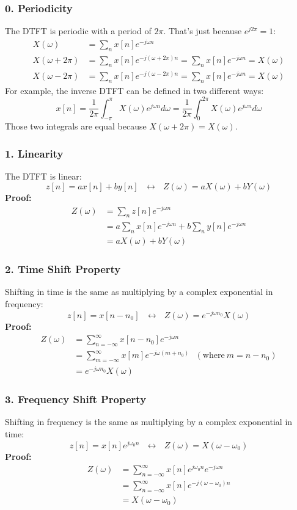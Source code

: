 \documentclass{beamer}
\begin{document}
\begin{frame}
  \frametitle{0. Periodicity}

  The DTFT is periodic with a  period of $2\pi$.  That's just because  $e^{j2\pi}=1$:
  \begin{align*}
    X(\omega) &= \sum_n x[n]e^{-j\omega n}\\
    X(\omega+2\pi) &= \sum_n x[n]e^{-j(\omega+2\pi) n} = \sum_n x[n]e^{-j\omega n} = X(\omega)\\
    X(\omega-2\pi) &= \sum_n x[n]e^{-j(\omega-2\pi) n} = \sum_n x[n]e^{-j\omega n} = X(\omega)
  \end{align*}
  For example, the inverse DTFT can be defined in two different ways:
  \[
  x[n]=\frac{1}{2\pi}\int_{-\pi}^\pi X(\omega)e^{j\omega n}d\omega =
  \frac{1}{2\pi}\int_{0}^{2\pi} X(\omega)e^{j\omega n}d\omega
  \]
  Those two integrals are equal because $X(\omega+2\pi)=X(\omega)$.
\end{frame}

\begin{frame}
  \frametitle{1. Linearity}

  The DTFT is linear:
  \[
  z[n] = ax[n]+by[n]~~~\leftrightarrow~~~
  Z(\omega)=aX(\omega)+bY(\omega)
  \]
  {\bf Proof:}
  \begin{align*}
    Z(\omega) &= \sum_n z[n]e^{-j\omega n}\\
    &= a\sum_n x[n]e^{-j\omega n} + b\sum_n y[n]e^{-j\omega n}\\
    &= aX(\omega) + bY(\omega)
  \end{align*}
\end{frame}

\begin{frame}
  \frametitle{2. Time Shift Property}

  Shifting in time is the same as multiplying by a  complex exponential in frequency:
  \[
  z[n] = x[n-n_0]~~~\leftrightarrow~~~
  Z(\omega)=e^{-j\omega n_0}X(\omega)
  \]
  {\bf Proof:}
  \begin{align*}
    Z(\omega) &= \sum_{n=-\infty}^{\infty} x[n-n_0]e^{-j\omega n}\\
    &= \sum_{m=-\infty}^{\infty} x[m]e^{-j\omega (m+n_0)}~~~\left(\mbox{where}~m=n-n_0\right)\\
    &= e^{-j\omega n_0} X(\omega)
  \end{align*}
\end{frame}

\begin{frame}
  \frametitle{3. Frequency Shift Property}

  Shifting in frequency is the same as multiplying by a complex exponential in time:
  \[
  z[n] = x[n]e^{j\omega_0 n}~~~\leftrightarrow~~~
  Z(\omega)=X(\omega-\omega_0)
  \]
  {\bf Proof:}
  \begin{align*}
    Z(\omega) &= \sum_{n=-\infty}^{\infty} x[n]e^{j\omega_0 n}e^{-j\omega n}\\
    &= \sum_{n=-\infty}^{\infty} x[n]e^{-j(\omega-\omega_0) n}\\
    &= X(\omega-\omega_0)
  \end{align*}
\end{frame}
\end{document}

